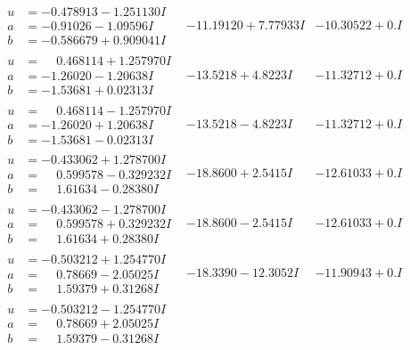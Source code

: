 \documentclass[1p]{elsarticle_modified}
\theoremstyle{definition}
\begin{document}
$$\begin{array}{c|c|c}
\begin{aligned}
u &= -0.478913 - 1.251130 I \\
a &= -0.91026 - 1.09596 I \\
b &= -0.586679 + 0.909041 I\end{aligned}
 & -11.19120 + 7.77933 I & -10.30522 + 0. I\phantom{ +0.000000I} \\ \hline\begin{aligned}
u &= \phantom{-}0.468114 + 1.257970 I \\
a &= -1.26020 - 1.20638 I \\
b &= -1.53681 + 0.02313 I\end{aligned}
 & -13.5218 + 4.8223 I & -11.32712 + 0. I\phantom{ +0.000000I} \\ \hline\begin{aligned}
u &= \phantom{-}0.468114 - 1.257970 I \\
a &= -1.26020 + 1.20638 I \\
b &= -1.53681 - 0.02313 I\end{aligned}
 & -13.5218 - 4.8223 I & -11.32712 + 0. I\phantom{ +0.000000I} \\ \hline\begin{aligned}
u &= -0.433062 + 1.278700 I \\
a &= \phantom{-}0.599578 - 0.329232 I \\
b &= \phantom{-}1.61634 - 0.28380 I\end{aligned}
 & -18.8600 + 2.5415 I & -12.61033 + 0. I\phantom{ +0.000000I} \\ \hline\begin{aligned}
u &= -0.433062 - 1.278700 I \\
a &= \phantom{-}0.599578 + 0.329232 I \\
b &= \phantom{-}1.61634 + 0.28380 I\end{aligned}
 & -18.8600 - 2.5415 I & -12.61033 + 0. I\phantom{ +0.000000I} \\ \hline\begin{aligned}
u &= -0.503212 + 1.254770 I \\
a &= \phantom{-}0.78669 - 2.05025 I \\
b &= \phantom{-}1.59379 + 0.31268 I\end{aligned}
 & -18.3390 - 12.3052 I & -11.90943 + 0. I\phantom{ +0.000000I} \\ \hline\begin{aligned}
u &= -0.503212 - 1.254770 I \\
a &= \phantom{-}0.78669 + 2.05025 I \\
b &= \phantom{-}1.59379 - 0.31268 I\end{aligned}

\end{array}$$
\end{document}
